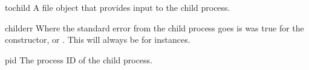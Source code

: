 \begin{memberdesc}{tochild}
A file object that provides input to the child process.
\end{memberdesc}

\begin{memberdesc}{childerr}
Where the standard error from the child process goes is
 was true for the constructor, or .
This will always be  for  instances.
\end{memberdesc}

\begin{memberdesc}{pid}
The process ID of the child process.
\end{memberdesc}
